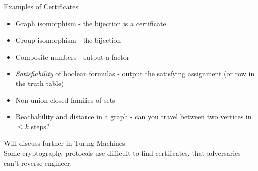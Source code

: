 \documentclass{beamer}
\begin{document}
\begin{frame}{Examples of Certificates}
    \begin{itemize}
        \item Graph isomorphism - the bijection is a certificate
        \item Group isomorphism - the bijection
        \item Composite numbers - output a factor
        \item \emph{Satisfiability} of boolean formulas - output the satisfying assignment (or row in the truth table)
        \item Non-union closed families of sets
        \item Reachability and distance in a graph - can you travel between two vertices in \( \leq k\) steps?
    \end{itemize}
Will discuss further in Turing Machines.\\
Some cryptography protocols use difficult-to-find certificates, that adversaries can't reverse-engineer.
\end{frame}
\end{document}

